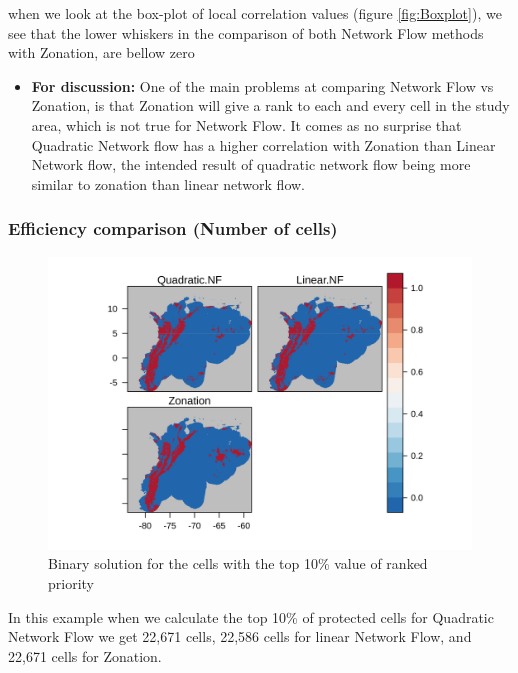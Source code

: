 \documentclass[]{article}
\providecommand{\tightlist}{%
  \setlength{\itemsep}{0pt}\setlength{\parskip}{0pt}}
\begin{document}
when we look at the box-plot of local correlation values (figure \ref{fig:Boxplot}), we see that the lower whiskers in the comparison of both Network Flow methods with Zonation, are bellow zero

\begin{itemize}
\tightlist
\item
  \textbf{For discussion:} One of the main problems at comparing Network Flow vs Zonation, is that Zonation will give a rank to each and every cell in the study area, which is not true for Network Flow. It comes as no surprise that Quadratic Network flow has a higher correlation with Zonation than Linear Network flow, the intended result of quadratic network flow being more similar to zonation than linear network flow.
\end{itemize}

\hypertarget{efficiency-comparison-number-of-cells}{%
\subsubsection{Efficiency comparison (Number of cells)}\label{efficiency-comparison-number-of-cells}}

\begin{figure}
\centering
\includegraphics{NFPaper_files/figure-latex/Binary-1.png}
\caption{\label{fig:Binary}Binary solution for the cells with the top 10\% value of ranked priority}
\end{figure}

In this example when we calculate the top 10\% of protected cells for Quadratic Network Flow we get 22,671 cells, 22,586 cells for linear Network Flow, and 22,671 cells for Zonation.
\end{document}
